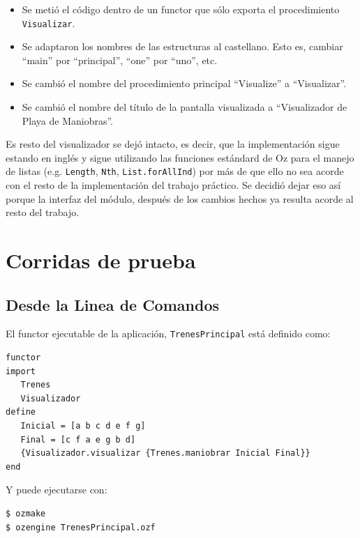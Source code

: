 \documentclass[12pt,titlepage]{article}
\begin{document}
\begin{itemize}
  \item Se metió el código dentro de un functor que sólo exporta el procedimiento \lstinline|Visualizar|.
  \item Se adaptaron los nombres de las estructuras al castellano. Esto es, cambiar ``main'' por ``principal'', ``one'' por ``uno'', etc.
  \item Se cambió el nombre del procedimiento principal ``Visualize'' a ``Visualizar''.
  \item Se cambió el nombre del título de la pantalla visualizada a ``Visualizador de Playa de Maniobras''.
\end{itemize}

Es resto del visualizador se dejó intacto, es decir, que la implementación sigue estando en inglés y sigue utilizando las funciones estándard de Oz para el manejo de listas (e.g. \lstinline|Length|, \lstinline|Nth|, \lstinline|List.forAllInd|) por más de que ello no sea acorde con el resto de la implementación del trabajo práctico. Se decidió dejar eso así porque la interfaz del módulo, después de los cambios hechos ya resulta acorde al resto del trabajo.

\section{Corridas de prueba}

\subsection{Desde la Linea de Comandos}

El functor ejecutable de la aplicación, \lstinline|TrenesPrincipal| está definido como:
\begin{lstlisting}[basicstyle=\ttfamily\footnotesize]
functor
import
   Trenes
   Visualizador
define
   Inicial = [a b c d e f g]
   Final = [c f a e g b d]
   {Visualizador.visualizar {Trenes.maniobrar Inicial Final}}
end
\end{lstlisting}

Y puede ejecutarse con:
\begin{lstlisting}
$ ozmake
$ ozengine TrenesPrincipal.ozf
\end{lstlisting}
\end{document}
